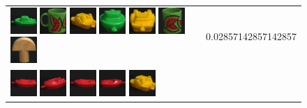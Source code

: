 \begin{figure}[tbp]
\begin{center}
\begin{tabular}{m{11cm} | m{3cm} |}
\includegraphics[width=1cm]{coil/beeld-54.eps}
\includegraphics[width=1cm]{coil/beeld-31.eps}
\includegraphics[width=1cm]{coil/beeld-16.eps}
\includegraphics[width=1cm]{coil/beeld-56.eps}
\includegraphics[width=1cm]{coil/beeld-14.eps}
\includegraphics[width=1cm]{coil/beeld-32.eps}
\includegraphics[width=1cm]{coil/beeld-0.eps}
& {\scriptsize 0.02857142857142857}
\\
\includegraphics[width=1cm]{coil/beeld-18.eps}
\includegraphics[width=1cm]{coil/beeld-21.eps}
\includegraphics[width=1cm]{coil/beeld-18.eps}
\includegraphics[width=1cm]{coil/beeld-19.eps}
\includegraphics[width=1cm]{coil/beeld-16.eps}

\end{tabular}
\end{center}
\end{figure}

